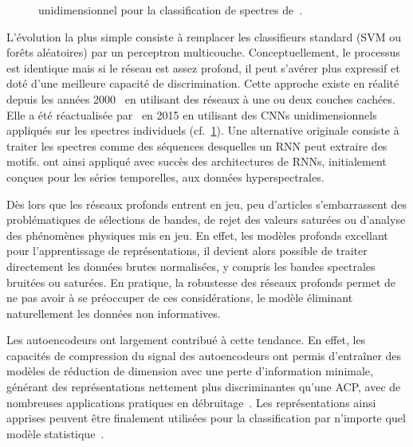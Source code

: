 \begin{figure}[h]
  \resizebox{\textwidth}{!}{}
  \caption[ unidimensionnel pour la classification de spectres.]{ unidimensionnel pour la classification de spectres de~\citet{hu_deep_2015}.}
  \label{fig:cnn1d_hsi}
\end{figure}

L'évolution la plus simple consiste à remplacer les classifieurs standard (\gls{SVM} ou forêts aléatoires) par un perceptron multicouche. Conceptuellement, le processus est identique mais si le réseau est assez profond, il peut s'avérer plus expressif et doté d'une meilleure capacité de discrimination. Cette approche existe en réalité depuis les années 2000~\cite{goel_classification_2003,ratle_semisupervised_2010} en utilisant des réseaux à une ou deux couches cachées. Elle a été réactualisée par~\citet{hu_deep_2015} en 2015 en utilisant des \glspl{CNN} unidimensionnels appliqués sur les spectres individuels (cf.~\cref{fig:cnn1d_hsi}). Une alternative originale consiste à traiter les spectres comme des séquences desquelles un \gls{RNN} peut extraire des motifs. \citet{mou_deep_2017} ont ainsi appliqué avec succès des architectures de \glspl{RNN}, initialement conçues pour les séries temporelles, aux données hyperspectrales.

Dès lors que les réseaux profonds entrent en jeu, peu d'articles s'embarrassent des problématiques de sélections de bandes, de rejet des valeurs saturées ou d'analyse des phénomènes physiques mis en jeu. En effet, les modèles profonds excellant pour l'apprentissage de représentations, il devient alors possible de traiter directement les données brutes normalisées, y compris les bandes spectrales bruitées ou saturées. En pratique, la robustesse des réseaux profonds permet de ne pas avoir à se préoccuper de ces considérations, le modèle éliminant naturellement les données non informatives.

Les autoencodeurs ont largement contribué à cette tendance. En effet, les capacités de compression du signal des autoencodeurs ont permis d'entraîner des modèles de réduction de dimension avec une perte d'information minimale, générant des représentations nettement plus discriminantes qu'une \gls{ACP}, avec de nombreuses applications pratiques en débruitage~\cite{xing_stacked_2015}. Les représentations ainsi apprises peuvent être finalement utilisées pour la classification par n'importe quel modèle statistique~\cite{fu_semi-supervised_2016}.

